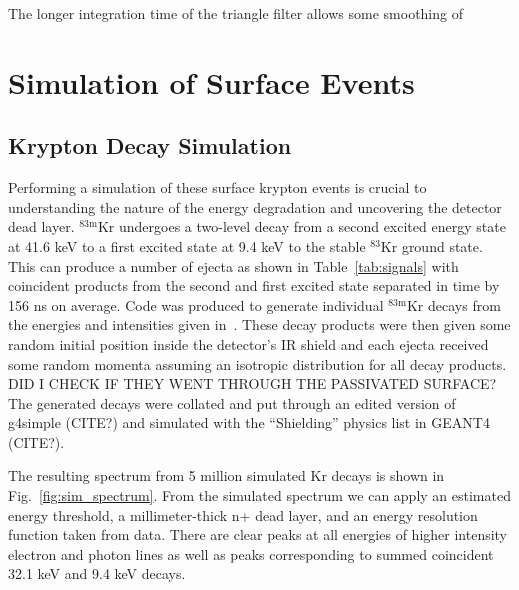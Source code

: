 \documentclass[nofootinbib,superscriptaddress, aps, prc, 
10pt, amsmath, amssymb, bibnotes,
altaffilletter, twocolumn, floatfix]{revtex4-2}
\def\kr83{{${}^{83\mathrm{m}}$Kr}}
\begin{document}
    The longer integration time of the triangle filter allows some smoothing of


\section{Simulation of Surface Events}
    \subsection{Krypton Decay Simulation}
    Performing a simulation of these surface krypton events is crucial to understanding the nature of the energy degradation and uncovering the detector dead layer. \kr83 undergoes a two-level decay from a second excited energy state at 41.6 keV to a first excited state at 9.4 keV to the stable ${}^{83}$Kr ground state. This can produce a number of ejecta as shown in Table~\ref{tab:signals} with coincident products from the second and first excited state separated in time by 156 ns on average. Code was produced to generate individual \kr83 decays from the energies and intensities given in~\cite{mccutchan_nuclear_2015}. These decay products were then given some random initial position inside the detector's IR shield and each ejecta received some random momenta assuming an isotropic distribution for all decay products. DID I CHECK IF THEY WENT THROUGH THE PASSIVATED SURFACE? The generated decays were collated and put through an edited version of g4simple (CITE?) and simulated with the ``Shielding'' physics list in GEANT4 (CITE?). 

    The resulting spectrum from 5 million simulated Kr decays is shown in Fig.~\ref{fig:sim_spectrum}. From the simulated spectrum we can apply an estimated energy threshold, a millimeter-thick n+ dead layer, and an energy resolution function taken from data. There are clear peaks at all energies of higher intensity electron and photon lines as well as peaks corresponding to summed coincident 32.1 keV and 9.4 keV decays. 
\end{document}

